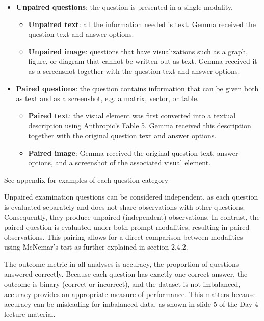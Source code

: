 \documentclass{article}
\begin{document}
\begin{itemize}
    \item \textbf{Unpaired questions}: the question is presented in a single modality.
    \begin{itemize}
        \item \textbf{Unpaired text}: all the information needed is text. Gemma received the question text and answer options.
        \item \textbf{Unpaired image}: questions that have visualizations such as a graph, figure, or diagram that cannot be written out as text. Gemma received it as a screenshot together with the question text and answer options.
    \end{itemize}
    \item \textbf{Paired questions}: the question contains information that can be given both as text and as a screenshot, e.g. a matrix, vector, or table.
    \begin{itemize}
        \item \textbf{Paired text}: the visual element was first converted into a textual description using Anthropic's Fable 5. Gemma received this description together with the original question text and answer options.
        \item \textbf{Paired image}: Gemma received the original question text, answer options, and a screenshot of the associated visual element.
    \end{itemize}
\end{itemize}

\small{See appendix for examples of each question category}\newline


Unpaired examination questions can be considered independent, as each question is evaluated separately and does not share observations with other questions. Consequently, they produce unpaired (independent) observations. In contrast, the paired question is evaluated under both prompt modalities, resulting in paired observations. This pairing allows for a direct comparison between modalities using McNemar’s test as further explained in section 2.4.2.

The outcome metric in all analyses is accuracy, the proportion of questions answered correctly. Because each question has exactly one correct answer, the outcome is binary (correct or incorrect), and the dataset is not imbalanced, accuracy provides an appropriate measure of performance. This matters because accuracy can be misleading for imbalanced data, as shown in slide 5 of the Day 4 lecture material\supercite{das2026day4}.
\end{document}
